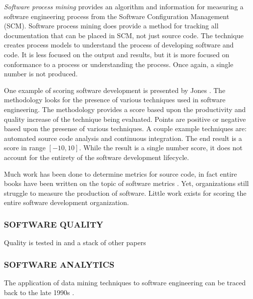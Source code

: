 \documentclass[SDSUThesis.tex]{subfiles}
\begin{document}
\textit{Software process mining} \cite{Rubin2007} provides
an algorithm and information for measuring a software engineering process from
the Software Configuration Management (SCM). Software process mining does provide a method for tracking all 
documentation that can be placed in SCM, not just source code.  The technique creates process models 
to understand the process of developing software and code. It is less focused on the output and results,
but it is more focused on conformance to a process or understanding the process. Once again, a single number is not produced.

One example of scoring software development is presented by Jones \cite{Jones2012}. The methodology looks
for the presence of various techniques used in software engineering.  The methodology provides a score based upon the 
productivity and quality increase of the technique being evaluated.  Points are positive or negative based upon the 
presense of various techniques. A couple example techniques are: 
automated source code analysis and continuous integration.  The end result is a score in range $[-10,10]$. 
While the result is a single number score, it does not account for the entirety of the software development lifecycle.

Much work has been done to determine metrics for source code, in fact 
entire books have been written on the topic of software metrics \cite{Jones1996, Putnam2013}. Yet, 
organizations still struggle to measure the production of software.
Little work exists
for scoring the entire software development organization. 

\subsubsection{SOFTWARE QUALITY}
Quality is tested in \cite{Miguel2014} and a stack of other papers

\subsubsection{SOFTWARE ANALYTICS}
The application of data mining techniques to software engineering can be traced back to the
late 1990s \cite{Ruhe1997,Ebert1999,Goel1997}.
\end{document}
